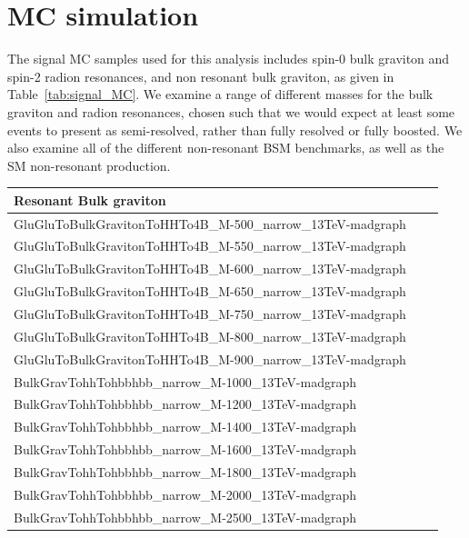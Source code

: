 \section{MC simulation\label{ss:MCSimulation}}

The signal MC samples used for this analysis includes spin-0 bulk graviton and spin-2 radion resonances, and non resonant bulk graviton, 
as given in Table~\ref{tab:signal_MC}. We examine a range of different masses for the bulk graviton and radion resonances, chosen such that we would expect at least some events to present as semi-resolved, rather than fully resolved or fully boosted. We also examine all of the different non-resonant BSM benchmarks, as well as the SM non-resonant production.

\begin{table}[htb]\footnotesize
  \begin{center}
    \begin{tabular}{l|c|c}
      \hline
      \hline
      Resonant Bulk graviton \\
      \hline
      {GluGluToBulkGravitonToHHTo4B\_M-500\_narrow\_13TeV-madgraph}  \\
      {GluGluToBulkGravitonToHHTo4B\_M-550\_narrow\_13TeV-madgraph} \\
      {GluGluToBulkGravitonToHHTo4B\_M-600\_narrow\_13TeV-madgraph} \\
      {GluGluToBulkGravitonToHHTo4B\_M-650\_narrow\_13TeV-madgraph}  \\
      {GluGluToBulkGravitonToHHTo4B\_M-750\_narrow\_13TeV-madgraph} \\
      {GluGluToBulkGravitonToHHTo4B\_M-800\_narrow\_13TeV-madgraph} \\
      {GluGluToBulkGravitonToHHTo4B\_M-900\_narrow\_13TeV-madgraph} \\
      {BulkGravTohhTohbbhbb\_narrow\_M-1000\_13TeV-madgraph}  \\
      {BulkGravTohhTohbbhbb\_narrow\_M-1200\_13TeV-madgraph}  \\
      {BulkGravTohhTohbbhbb\_narrow\_M-1400\_13TeV-madgraph}  \\
      {BulkGravTohhTohbbhbb\_narrow\_M-1600\_13TeV-madgraph} \\
      {BulkGravTohhTohbbhbb\_narrow\_M-1800\_13TeV-madgraph}\\
      {BulkGravTohhTohbbhbb\_narrow\_M-2000\_13TeV-madgraph} \\
      {BulkGravTohhTohbbhbb\_narrow\_M-2500\_13TeV-madgraph} \\

\end{tabular}
\end{center}
\end{table}
